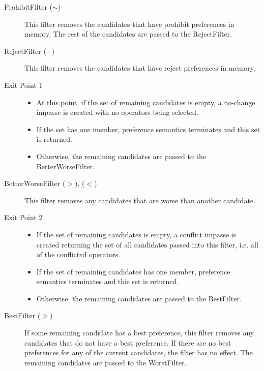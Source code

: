 \begin{description}
	
	\item[ProhibitFilter ($\sim$) ] This filter removes the candidates that
	have prohibit preferences in memory. The rest of the candidates are passed to
	the RejectFilter.
	\index{~}
	
	\item[RejectFilter ($-$) ] This filter removes the candidates that have
	reject preferences in memory. 
	\index{-}
	
	\item[Exit Point 1]
	\begin{itemize}
		\item At this point, if the set of remaining candidates is empty, a no-change impasse
		is created with no operators being selected.
		\item If the set has one member, preference semantics terminates and this set is returned.
		\item Otherwise, the remaining candidates are passed to the
		BetterWorseFilter.
	\end{itemize}
	\index{-}
	
	\item[BetterWorseFilter ($>$), ($<$) ] This filter removes any candidates that are worse
	than another candidate.
	\index{<}
	\index{>}
	
	\item[Exit Point 2]
	\begin{itemize}
		\item If the set of remaining candidates is empty, a conflict impasse is created
		returning the set of all candidates passed into this filter, i.e. all of the
		conflicted operators.
		\item If the set of remaining candidates has one
		member, preference semantics terminates and this set is returned.
		\item Otherwise, the remaining candidates are passed to the
		BestFilter.
	\end{itemize}
	\index{-}
	
	\item[BestFilter ($>$) ] If some remaining candidate has a best preference,
	this filter removes any candidates that do not have
	a best preference. If there are no best preferences for any of the current
	candidates, the filter has no effect. The remaining candidates are passed
	to the WorstFilter.
	

\end{description}
